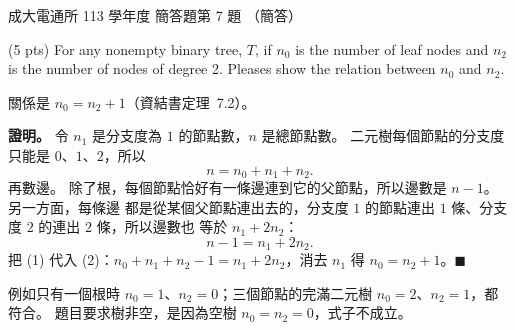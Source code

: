 \begin{pastexam}[label={px:ncku-113-cce-16}]{成大電通所 113 學年度 簡答題第 7 題}
（簡答）

(5 pts) For any nonempty binary tree, $T$, if $n_0$ is the number of leaf nodes and $n_2$ is the
number of nodes of degree 2. Pleases show the relation between $n_0$ and $n_2$.
\end{pastexam}

\begin{pastsoln}
關係是 $n_0 = n_2 + 1$（資結書定理~7.2）。

\textbf{證明。} 令 $n_1$ 是分支度為 $1$ 的節點數，$n$ 是總節點數。 二元樹每個節點的分支度只能是
$0$、$1$、$2$，所以
\[
n = n_0 + n_1 + n_2 . \tag{1}
\]
再數邊。 除了根，每個節點恰好有一條邊連到它的父節點，所以邊數是 $n - 1$。 另一方面，每條邊
都是從某個父節點連出去的，分支度 $1$ 的節點連出 $1$ 條、分支度 $2$ 的連出 $2$ 條，所以邊數也
等於 $n_1 + 2n_2$：
\[
n - 1 = n_1 + 2n_2 . \tag{2}
\]
把 (1) 代入 (2)：$n_0 + n_1 + n_2 - 1 = n_1 + 2n_2$，消去 $n_1$ 得 $n_0 = n_2 + 1$。\hfill$\blacksquare$

例如只有一個根時 $n_0 = 1$、$n_2 = 0$；三個節點的完滿二元樹 $n_0 = 2$、$n_2 = 1$，都符合。
題目要求樹非空，是因為空樹 $n_0 = n_2 = 0$，式子不成立。
\end{pastsoln}
